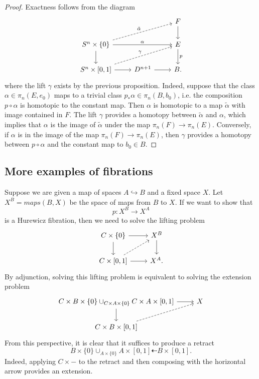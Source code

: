 \documentclass{article}
\newtheorem{proposed work}[theorem]{Proposed Work}
\begin{document}
\begin{proof}
Exactness follows from the diagram
\[
\begin{tikzcd}
 && F \arrow[d] \\
S^n \times \{0\} \arrow[dashed,urr,"\tilde{\alpha}"] \arrow[rr,"\alpha"] \arrow[d] & &E \arrow[d,"p"] \\
S^n \times [0,1] \arrow[r] \arrow[dashed, urr, "\gamma"]&D^{n+1} \arrow{r} &B.
\end{tikzcd}
\]
where the lift $\gamma$ exists by the previous proposition. Indeed, suppose that the class $\alpha \in \pi_n(E,e_0)$ maps to a trivial class $p_*\alpha \in \pi_n (B,b_0)$, i.e. the composition $p \circ \alpha$ is homotopic to the constant map. Then $\alpha$ is homotopic to a map $\tilde{\alpha}$ with image contained in $F$. The lift $\gamma$ provides a homotopy between $\tilde{\alpha}$ and $\alpha$, which implies that $\alpha$ is the image of $\tilde{\alpha}$ under the map $\pi_n(F) \to \pi_n(E)$. Conversely, if $\alpha$ is in the image of the map $\pi_n(F) \to \pi_n(E)$, then $\gamma$ provides a homotopy between $p \circ \alpha$ and the constant map to $b_0 \in B$.
\end{proof}

\subsection{More examples of fibrations}
Suppose we are given a map of spaces $A \hookrightarrow B$ and a fixed space $X$. Let $X^B = maps(B,X)$ be the space of maps from $B$ to $X$. If we want to show that
$$p : X^B \to X^A$$
is a Hurewicz fibration, then we need to solve the lifting problem
\[
\begin{tikzcd}
C \times \{0\} \arrow[r] \arrow[d] & X^B \arrow[d] \\
C \times [0,1] \arrow[r] \arrow[dashed,ur] & X^A.
\end{tikzcd}
\]
By adjunction, solving this lifting problem is equivalent to solving the extension problem
\[
\begin{tikzcd}
C \times B \times \{0 \} \cup_{C \times A \times \{0\}} C \times A \times [0,1] \arrow[r] \arrow[d] & X \\
C \times B \times [0,1] \arrow[dashed,ur]
\end{tikzcd}
\]
From this perspective, it is clear that it suffices to produce a retract
$$B \times \{0\} \cup_{A \times \{0\}} A \times [0,1] \dashleftarrow B \times [0,1].$$
Indeed, applying $C \times -$ to the retract and then composing with the horizontal arrow provides an extension. 
\end{document}
